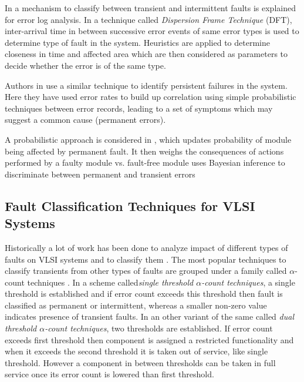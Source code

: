 In \cite{Lin1990} a mechanism to classify between transient and intermittent faults is explained for error log analysis. In a technique called \emph{Dispersion Frame Technique} (DFT), inter-arrival time in between successive error events of same error types is used to determine type of fault in the system. Heuristics are applied to determine closeness in time and affected area which are then considered as parameters to decide whether the error is of the same type.

Authors in \cite{Iyer1990} use a similar technique to identify persistent failures in the system. Here they have used error rates to build up correlation using simple probabilistic techniques between error records, leading to a set of symptoms which may suggest a common cause (permanent errors).

A probabilistic approach is considered in \cite{Pizza1998}, which updates probability of module being affected by permanent fault. It then weighs the consequences of actions performed by a faulty module vs. fault-free module uses Bayesian inference to discriminate between permanent and transient errors

\subsection{Fault Classification Techniques for VLSI Systems}
Historically a lot of work has been done to analyze impact of different types of faults on VLSI systems \cite{Constantinescu2003,Constantinescu2007,Dodd2003} and to classify them \cite{Savir1980, Espinosa2013, Bondavalli2000, DeKleer2009}. The most popular techniques to classify transients from other types of faults are grouped under a family called $\alpha$-count techniques \cite{Bondavalli2000}. In a scheme called\emph{single threshold $\alpha$-count techniques}, a single threshold is established and if error count exceeds this threshold then fault is classified as permanent or intermittent, whereas a smaller non-zero value indicates presence of transient faults. In an other variant of the same called \emph{dual threshold $\alpha$-count techniques}, two thresholds are established. If error count exceeds first threshold then component is assigned a restricted functionality and when it exceeds the second threshold it is taken out of service, like single threshold. However a component in between thresholds can be taken in full service once its error count is lowered than first threshold.

